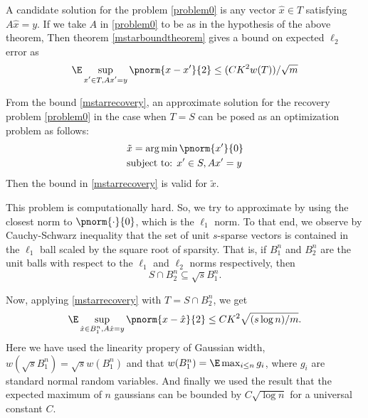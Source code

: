 A candidate solution for the problem \eqref{problem0} is any vector $\hat{x}\in T$
satisfying $A\hat{x} = y$.
If we take $A$ in \eqref{problem0} to be as in the hypothesis of the above theorem,
Then theorem \ref{mstarboundtheorem} gives a bound on expected $\ell_2$ error as
\begin{equation}\label{mstarrecovery}
	\E\sup_{\substack{{x'}\in T, A{x'}=y}}\pnorm{x-{x'}}{2}
		\leq ({CK^2} w(T))/{\sqrt{m}}
\end{equation}

From the bound \eqref{mstarrecovery}, an approximate solution for the recovery problem
\eqref{problem0} in the case when $T = S$
can be posed as an optimization problem as follows:
\begin{equation}\label{optprob0}
	\begin{split}
		&\tilde{x} = \arg\min\pnorm{x'}{0}\\
		&\text{subject to: } x'\in S,  Ax' = y
	\end{split}
\end{equation}
Then the bound in \eqref{mstarrecovery} is valid for $\tilde{x}$.

This problem is computationally hard. So, we try to approximate
by using the closest norm to $\pnorm{\cdot}{0}$, which is the $\ell_1$ norm.
To that end, we observe by Cauchy-Schwarz inequality  that
the set of unit $s$-sparse vectors is contained
in the $\ell_1$ ball scaled by the square root of sparsity.
That is, if $B_1^n$ and $B_2^n$ are the unit balls with respect
to the $\ell_1$ and $\ell_2$ norms respectively, then
\begin{equation}\label{inclusiontheorem}
	S\cap B_2^n\subseteq \sqrt{s} B_1^n.
\end{equation}


Now, applying \eqref{mstarrecovery} with $T = S\cap B_2^n$, we get
\begin{equation}\label{scaledl1ball}
	\E\sup_{\hat{x}\in B_1^n, A\hat{x}=y}\pnorm{x-\hat{x}}{2}\leq
	CK^2\sqrt{({s\log n})/{m}}.
\end{equation}
Here we have used the linearity propery of Gaussian width, $w(\sqrt{s}B_1^n)=\sqrt{s}w(B_1^n)$
and that $w(B_1^n) = \E\max_{i\leq n} g_i$, where $g_i$ are standard normal random variables.
And finally we used the result that the expected maximum of $n$ gaussians can be
bounded by $C\sqrt{\log n}$ for a universal constant $C$.

